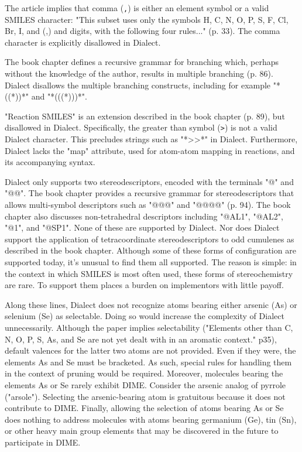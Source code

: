 \documentclass{article}
\def\ttt{\texttt}
\begin{document}
The article implies that comma (\ttt{,}) is either an element symbol or a valid SMILES character: "This subset uses only the symbols H, C, N, O, P, S, F, Cl, Br, I, and (,) and digits, with the following four rules..." (p. 33). The comma character is explicitly disallowed in Dialect.

The book chapter defines a recursive grammar for branching which, perhaps without the knowledge of the author, results in multiple branching (p. 86). Dialect disallows the multiple branching constructs, including for example "*((*))*" and "*(((*)))*".

"Reaction SMILES" is an extension described in the book chapter (p. 89), but disallowed in Dialect. Specifically, the greater than symbol (\ttt{>}) is not a valid Dialect character. This precludes strings such as "*>>*" in Dialect. Furthermore, Dialect lacks the "map" attribute, used for atom-atom mapping in reactions, and its accompanying syntax.

Dialect only supports two stereodescriptors, encoded with the terminals "@" and "@@". The book chapter provides a recursive grammar for stereodescriptors that allows multi-symbol descriptors such as "@@@" and "@@@@" (p. 94). The book chapter also discusses non-tetrahedral descriptors including "@AL1", "@AL2", "@1", and "@SP1". None of these are supported by Dialect. Nor does Dialect support the application of tetracoordinate stereodescriptors to odd cumulenes as described in the book chapter. Although some of these forms of configuration are supported today, it's unusual to find them all supported. The reason is simple: in the context in which SMILES is most often used, these forms of stereochemistry are rare. To support them places a burden on implementors with little payoff.

Along these lines, Dialect does not recognize atoms bearing either arsenic (As) or selenium (Se) as selectable. Doing so would increase the complexity of Dialect unnecessarily. Although the paper implies selectability ("Elements other than C, N, O, P, S, As, and Se are not yet dealt with in an aromatic context." p35), default valences for the latter two atoms are not provided. Even if they were, the elements As and Se must be bracketed. As such, special rules for handling them in the context of pruning would be required. Moreover, molecules bearing the elements As or Se rarely exhibit DIME. Consider the arsenic analog of pyrrole ("arsole"). Selecting the arsenic-bearing atom is gratuitous because it does not contribute to DIME. Finally, allowing the selection of atoms bearing As or Se does nothing to address molecules with atoms bearing germanium (Ge), tin (Sn), or other heavy main group elements that may be discovered in the future to participate in DIME.
\end{document}
